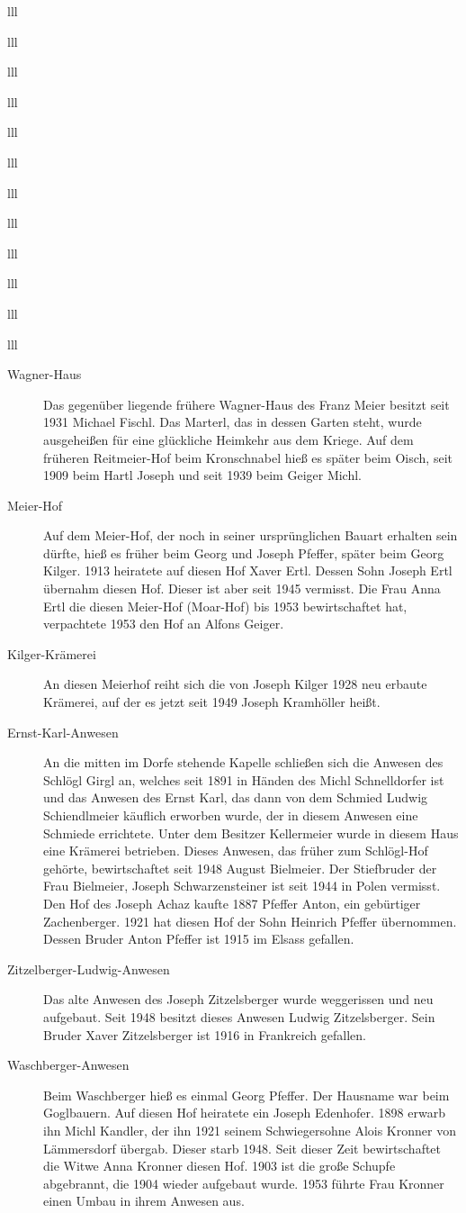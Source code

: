 \documentclass[12pt,a4pager]{book}
\begin{document}
\begin{tabuluar}{lll}
\begin{tabuluar}{lll}
\begin{tabuluar}{lll}
\begin{tabuluar}{lll}
\begin{tabuluar}{lll}
\begin{tabuluar}{lll}
\begin{tabuluar}{lll}
\begin{tabuluar}{lll}
\begin{tabuluar}{lll}
\begin{tabuluar}{lll}
\begin{tabuluar}{lll}
\begin{tabuluar}{lll}
\begin{description}
\item[Wagner-Haus] Das gegenüber liegende frühere Wagner-Haus des Franz Meier
besitzt seit 1931 Michael Fischl. Das Marterl, das in dessen Garten steht, wurde
ausgeheißen für eine glückliche Heimkehr aus dem Kriege. Auf dem früheren
Reitmeier-Hof beim Kronschnabel hieß es später beim Oisch, seit 1909 beim Hartl
Joseph und seit 1939 beim Geiger Michl.

\item[Meier-Hof] Auf dem Meier-Hof, der noch in seiner ursprünglichen Bauart
erhalten sein dürfte, hieß es früher beim Georg und Joseph Pfeffer, später beim
Georg Kilger. 1913 heiratete auf diesen Hof Xaver Ertl. Dessen Sohn Joseph Ertl
übernahm diesen Hof. Dieser ist aber seit 1945 vermisst. Die Frau Anna Ertl die
diesen Meier-Hof (Moar-Hof) bis 1953 bewirtschaftet hat, verpachtete 1953 den
Hof an Alfons Geiger.

\item[Kilger-Krämerei] An diesen Meierhof reiht sich die von Joseph Kilger 1928
neu erbaute Krämerei, auf der es jetzt seit 1949 Joseph Kramhöller heißt.

\item[Ernst-Karl-Anwesen] An die mitten im Dorfe stehende Kapelle schließen sich
die Anwesen des Schlögl Girgl an, welches seit 1891 in Händen des Michl
Schnelldorfer ist und das Anwesen des Ernst Karl, das dann von dem Schmied
Ludwig Schiendlmeier käuflich erworben wurde, der in diesem Anwesen eine
Schmiede errichtete. Unter dem Besitzer Kellermeier wurde in diesem Haus eine
Krämerei betrieben. Dieses Anwesen, das früher zum Schlögl-Hof gehörte,
bewirtschaftet seit 1948 August Bielmeier. Der Stiefbruder der Frau Bielmeier,
Joseph Schwarzensteiner ist seit 1944 in Polen vermisst. Den Hof des Joseph
Achaz kaufte 1887 Pfeffer Anton, ein gebürtiger Zachenberger. 1921 hat diesen
Hof der Sohn Heinrich Pfeffer übernommen. Dessen Bruder Anton Pfeffer ist 1915
im Elsass gefallen.

\item[Zitzelberger-Ludwig-Anwesen] Das alte Anwesen des Joseph Zitzelsberger
wurde weggerissen und neu aufgebaut. Seit 1948 besitzt dieses Anwesen Ludwig
Zitzelsberger. Sein Bruder Xaver Zitzelsberger ist 1916 in Frankreich gefallen.

\item[Waschberger-Anwesen] Beim Waschberger hieß es einmal Georg Pfeffer. Der
Hausname war beim Goglbauern. Auf diesen Hof heiratete ein Joseph Edenhofer.
1898 erwarb ihn Michl Kandler, der ihn 1921 seinem Schwiegersohne Alois Kronner
von Lämmersdorf übergab. Dieser starb 1948. Seit dieser Zeit bewirtschaftet die
Witwe Anna Kronner diesen Hof. 1903 ist die große Schupfe abgebrannt, die 1904
wieder aufgebaut wurde. 1953 führte Frau Kronner einen Umbau in ihrem Anwesen
aus.


\end{description}
\end{tabuluar}
\end{tabuluar}
\end{tabuluar}
\end{tabuluar}
\end{tabuluar}
\end{tabuluar}
\end{tabuluar}
\end{tabuluar}
\end{tabuluar}
\end{tabuluar}
\end{tabuluar}
\end{tabuluar}
\end{document}
